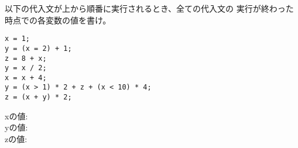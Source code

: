 \documentclass[a4j]{jarticle}
\begin{document}
\begin{multicols*}{2}
以下の代入文が上から順番に実行されるとき、全ての代入文の
実行が終わった時点での各変数の値を書け。

\begin{verbatim}
x = 1;
y = (x = 2) + 1;
z = 8 + x;
y = x / 2;
x = x + 4;
y = (x > 1) * 2 + z + (x < 10) * 4;
z = (x + y) * 2;
\end{verbatim}


{\ttfamily x}の値:\\

{\ttfamily y}の値:\\

{\ttfamily z}の値:\\






\vfill




\end{multicols*}
\end{document}
